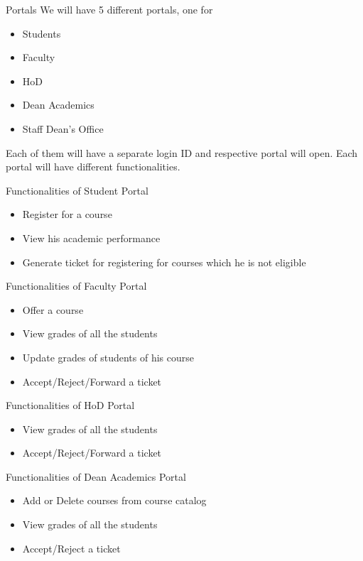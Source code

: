 \documentclass{beamer}
\begin{document}
\begin{frame}{Portals}
We will have 5 different portals, one for
\begin{itemize}
\item Students
\item Faculty
\item HoD
\item Dean Academics
\item Staff Dean's Office
\end{itemize}
Each of them will have a separate login ID and respective portal will open.
Each portal will have different functionalities.
\end{frame}

\begin{frame}{Functionalities of Student Portal}
\begin{itemize}
\item Register for a course
\item View his academic performance
\item Generate ticket for registering for courses which he is not eligible
\end{itemize}
\end{frame}

\begin{frame}{Functionalities of Faculty Portal}
\begin{itemize}
\item Offer a course
\item View grades of all the students
\item Update grades of students of his course
\item Accept/Reject/Forward a ticket
\end{itemize}
\end{frame}

\begin{frame}{Functionalities of HoD Portal}
\begin{itemize}
\item View grades of all the students
\item Accept/Reject/Forward a ticket
\end{itemize}
\end{frame}

\begin{frame}{Functionalities of Dean Academics Portal}
\begin{itemize}
\item Add or Delete courses from course catalog
\item View grades of all the students
\item Accept/Reject a ticket
\end{itemize}
\end{frame}
\end{document}
